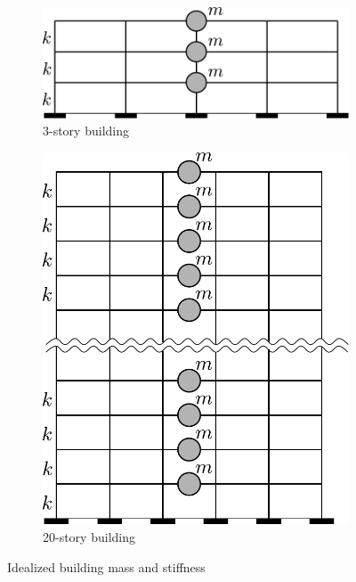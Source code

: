 \documentclass{simcenterdocumentation}
\begin{document}
\begin{figure}[H]
	\begin{subfigure}[b]{0.45\linewidth}
		\centering \includegraphics[scale=0.4]{3LA550_mass_model.pdf}
		\caption{3-story building}
	\end{subfigure}
	\begin{subfigure}[b]{0.45\linewidth}
		\centering \includegraphics[scale=0.4]{20LA550_mass_model.pdf}
		\caption{20-story building}
	\end{subfigure}
\caption{Idealized building mass and stiffness}
\label{fig:ideal_mass_stiffness}
\end{figure}
\end{document}
